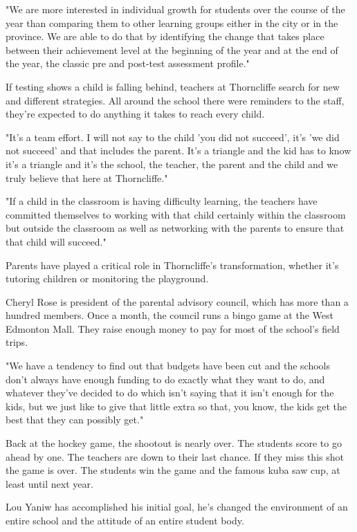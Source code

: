 "We are more interested in individual growth for students over the course of the year than comparing them to other learning groups either in the city or in the province. We are able to do that by identifying the change that takes place between their achievement level at the beginning of the year and at the end of the year, the classic pre and post-test assessment profile."

If testing shows a child is falling behind, teachers at Thorncliffe search for new and different strategies. All around the school there were reminders to the staff, they're expected to do anything it takes to reach every child.

"It's a team effort. I will not say to the child 'you did not succeed', it's 'we did not succeed' and that includes the parent. It's a triangle and the kid has to know it's a triangle and it's the school, the teacher, the parent and the child and we truly believe that here at Thorncliffe."

"If a child in the classroom is having difficulty learning, the teachers have committed themselves to working with that child certainly within the classroom but outside the classroom as well as networking with the parents to ensure that that child will succeed."

Parents have played a critical role in Thorncliffe's transformation, whether it's tutoring children or monitoring the playground.

Cheryl Rose is president of the parental advisory council, which has more than a hundred members. Once a month, the council runs a bingo game at the West Edmonton Mall. They raise enough money to pay for most of the school's field trips.

"We have a tendency to find out that budgets have been cut and the schools don't always have enough funding to do exactly what they want to do, and whatever they've decided to do which isn't saying that it isn't enough for the kids, but we just like to give that little extra so that, you know, the kids get the best that they can possibly get."

Back at the hockey game, the shootout is nearly over. The students score to go ahead by one. The teachers are down to their last chance. If they miss this shot the game is over. The students win the game and the famous kuba saw cup, at least until next year.

Lou Yaniw has accomplished his initial goal, he's changed the environment of an entire school and the attitude of an entire student body.

